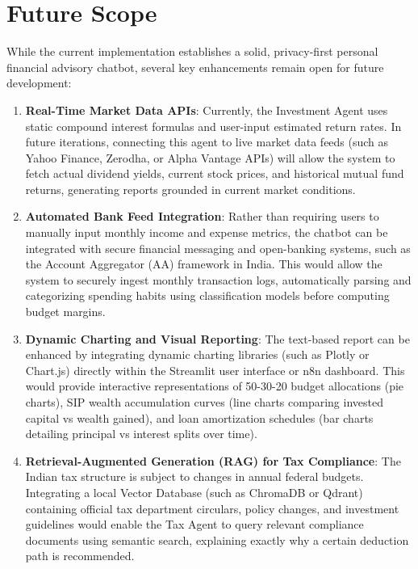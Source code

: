 \chapter{Future Scope}
While the current implementation establishes a solid, privacy-first personal financial advisory chatbot, several key enhancements remain open for future development:

\begin{enumerate}
    \item \textbf{Real-Time Market Data APIs}: Currently, the Investment Agent uses static compound interest formulas and user-input estimated return rates. In future iterations, connecting this agent to live market data feeds (such as Yahoo Finance, Zerodha, or Alpha Vantage APIs) will allow the system to fetch actual dividend yields, current stock prices, and historical mutual fund returns, generating reports grounded in current market conditions.
    \item \textbf{Automated Bank Feed Integration}: Rather than requiring users to manually input monthly income and expense metrics, the chatbot can be integrated with secure financial messaging and open-banking systems, such as the Account Aggregator (AA) framework in India. This would allow the system to securely ingest monthly transaction logs, automatically parsing and categorizing spending habits using classification models before computing budget margins.
    \item \textbf{Dynamic Charting and Visual Reporting}: The text-based report can be enhanced by integrating dynamic charting libraries (such as Plotly or Chart.js) directly within the Streamlit user interface or n8n dashboard. This would provide interactive representations of 50-30-20 budget allocations (pie charts), SIP wealth accumulation curves (line charts comparing invested capital vs wealth gained), and loan amortization schedules (bar charts detailing principal vs interest splits over time).
    \item \textbf{Retrieval-Augmented Generation (RAG) for Tax Compliance}: The Indian tax structure is subject to changes in annual federal budgets. Integrating a local Vector Database (such as ChromaDB or Qdrant) containing official tax department circulars, policy changes, and investment guidelines would enable the Tax Agent to query relevant compliance documents using semantic search, explaining exactly why a certain deduction path is recommended.
\end{enumerate}
